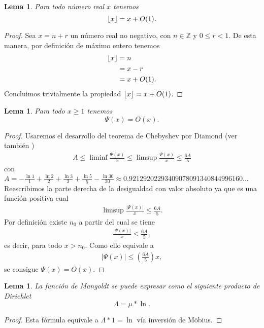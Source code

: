 \documentclass[10pt]{article}
\DeclarePairedDelimiter\floor{\lfloor}{\rfloor}
\newtheorem{lemma}[theorem]{Lema}
\theoremstyle{definition}
\theoremstyle{remark}
\newcommand{\BZ}{\mathbb Z}
\begin{document}
\begin{lemma}\label{lem11}
Para todo n\'umero real $x$ tenemos
\[
\floor{x} = x + O(1).
\]
\end{lemma}

\begin{proof}
Sea $x = n + r$ un n\'umero real no negativo, con $n \in \BZ$ y $0 \leq r < 1$. 
De esta manera, por definici\'on de m\'aximo entero tenemos
\begin{align}
\floor{x} &= n \\
&= x - r \\
&= x + O(1).
\end{align}
Concluimos trivialmente la propiedad $\floor{x} = x + O(1)$.
\end{proof}

\begin{lemma}\label{lem12}
Para todo $x \geq 1$ tenemos
\[
\Psi(x) = O(x).
\]
\end{lemma}

\begin{proof}
Usaremos el desarrollo del teorema de Chebyshev por Diamond \cite{Diamond} (ver tambi\'en \cite{Apostol}) 
\begin{align}
A \leq \liminf \frac{\Psi(x)}{x} \leq \limsup \frac{\Psi(x)}{x} \leq \frac{6A}{5}
\end{align}
con $A = -\frac{\ln 1}{1} + \frac{\ln 2}{2} + \frac{\ln 3}{3} + \frac{\ln 5}{5} - \frac{\ln 30}{30} \approx 0.92129202293409078091340844996160...$
Reescribimos la parte derecha de la desigualdad con valor absoluto ya que es una funci\'on positiva cual
\begin{align}
\limsup \frac{|\Psi(x)|}{x} \leq \frac{6A}{5}.
\end{align}
Por definici\'on existe $n_0$ a partir del cual se tiene 
\begin{align}
\frac{|\Psi(x)|}{x} \leq \frac{6A}{5},
\end{align}
es decir, para todo $x > n_0$.
Como ello equivale a
\begin{align}
|\Psi(x)| \leq \left(\frac{6A}{5}\right) x,
\end{align}
se consigue $\Psi(x) = O(x)$.
\end{proof}

\begin{lemma}\label{lem13}
La funci\'on de Mangoldt se puede expresar como el siguiente producto de Dirichlet
$$\Lambda = \mu * \ln.$$
\end{lemma}
\begin{proof}
Esta f\'ormula equivale a  $\Lambda * 1 = \ln$ v\'ia  inversi\'on de M\"obius.  
\end{proof}
\end{document}
